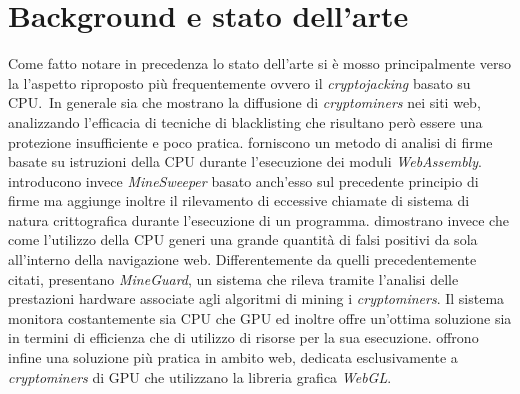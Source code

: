\documentclass[
11pt, %
oneside, %
italian, %
onehalfspacing,%
headsepline, %
]{MastersDoctoralThesis} %
\newcommand\citen[1]{\citeauthor{#1} \citep{#1}}
\begin{document}
{\chapter{Background e stato dell'arte}}
Come fatto notare in precedenza lo stato dell'arte si è mosso principalmente verso la l'aspetto riproposto più frequentemente ovvero il \emph{cryptojacking} basato su CPU.\ In generale sia \citen{musch2018web} che \citen{saad2018end} mostrano la diffusione di \emph{cryptominers} nei siti web, analizzando l'efficacia di tecniche di blacklisting che risultano però essere una protezione insufficiente e poco pratica. \citen{wang2018seismic} forniscono un metodo di analisi di firme basate su istruzioni della CPU durante l'esecuzione dei moduli \emph{WebAssembly}. \citen{konoth2018minesweeper} introducono invece \emph{MineSweeper} basato anch'esso sul precedente principio di firme ma aggiunge inoltre il rilevamento di eccessive chiamate di sistema di natura crittografica durante l'esecuzione di un programma. \citen{kharraz2019outguard} dimostrano invece che come l'utilizzo della CPU generi una grande quantità di falsi positivi da sola all'interno della navigazione web. Differentemente da quelli precedentemente citati, \citen{tahir2017mining} presentano \emph{MineGuard}, un sistema che rileva tramite l'analisi delle prestazioni hardware associate agli algoritmi di mining i \emph{cryptominers}. Il sistema monitora costantemente sia CPU che GPU ed inoltre offre un'ottima soluzione sia in termini di efficienza che di utilizzo di risorse per la sua esecuzione. \citen{belkin2019risks} offrono infine una soluzione più pratica in ambito web, dedicata esclusivamente a \emph{cryptominers} di GPU che utilizzano la libreria grafica \emph{WebGL}.
\end{document}
